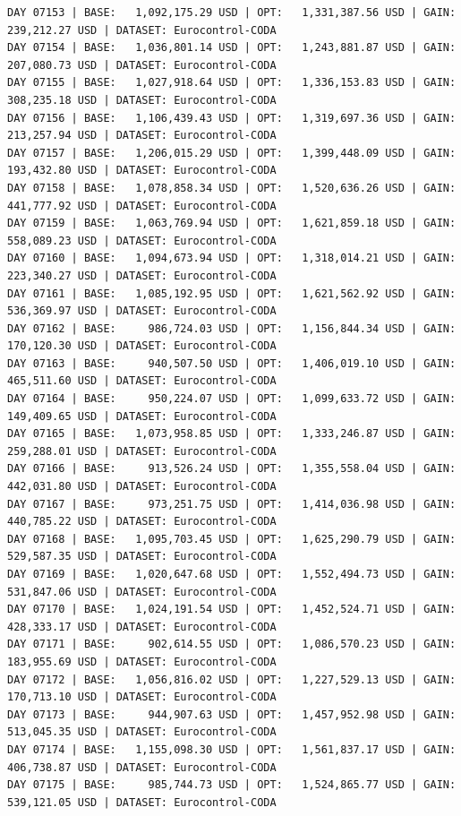 \documentclass[11pt,a4paper]{article}
\begin{document}
\begin{verbatim}
DAY 07153 | BASE:   1,092,175.29 USD | OPT:   1,331,387.56 USD | GAIN: 239,212.27 USD | DATASET: Eurocontrol-CODA
DAY 07154 | BASE:   1,036,801.14 USD | OPT:   1,243,881.87 USD | GAIN: 207,080.73 USD | DATASET: Eurocontrol-CODA
DAY 07155 | BASE:   1,027,918.64 USD | OPT:   1,336,153.83 USD | GAIN: 308,235.18 USD | DATASET: Eurocontrol-CODA
DAY 07156 | BASE:   1,106,439.43 USD | OPT:   1,319,697.36 USD | GAIN: 213,257.94 USD | DATASET: Eurocontrol-CODA
DAY 07157 | BASE:   1,206,015.29 USD | OPT:   1,399,448.09 USD | GAIN: 193,432.80 USD | DATASET: Eurocontrol-CODA
DAY 07158 | BASE:   1,078,858.34 USD | OPT:   1,520,636.26 USD | GAIN: 441,777.92 USD | DATASET: Eurocontrol-CODA
DAY 07159 | BASE:   1,063,769.94 USD | OPT:   1,621,859.18 USD | GAIN: 558,089.23 USD | DATASET: Eurocontrol-CODA
DAY 07160 | BASE:   1,094,673.94 USD | OPT:   1,318,014.21 USD | GAIN: 223,340.27 USD | DATASET: Eurocontrol-CODA
DAY 07161 | BASE:   1,085,192.95 USD | OPT:   1,621,562.92 USD | GAIN: 536,369.97 USD | DATASET: Eurocontrol-CODA
DAY 07162 | BASE:     986,724.03 USD | OPT:   1,156,844.34 USD | GAIN: 170,120.30 USD | DATASET: Eurocontrol-CODA
DAY 07163 | BASE:     940,507.50 USD | OPT:   1,406,019.10 USD | GAIN: 465,511.60 USD | DATASET: Eurocontrol-CODA
DAY 07164 | BASE:     950,224.07 USD | OPT:   1,099,633.72 USD | GAIN: 149,409.65 USD | DATASET: Eurocontrol-CODA
DAY 07165 | BASE:   1,073,958.85 USD | OPT:   1,333,246.87 USD | GAIN: 259,288.01 USD | DATASET: Eurocontrol-CODA
DAY 07166 | BASE:     913,526.24 USD | OPT:   1,355,558.04 USD | GAIN: 442,031.80 USD | DATASET: Eurocontrol-CODA
DAY 07167 | BASE:     973,251.75 USD | OPT:   1,414,036.98 USD | GAIN: 440,785.22 USD | DATASET: Eurocontrol-CODA
DAY 07168 | BASE:   1,095,703.45 USD | OPT:   1,625,290.79 USD | GAIN: 529,587.35 USD | DATASET: Eurocontrol-CODA
DAY 07169 | BASE:   1,020,647.68 USD | OPT:   1,552,494.73 USD | GAIN: 531,847.06 USD | DATASET: Eurocontrol-CODA
DAY 07170 | BASE:   1,024,191.54 USD | OPT:   1,452,524.71 USD | GAIN: 428,333.17 USD | DATASET: Eurocontrol-CODA
DAY 07171 | BASE:     902,614.55 USD | OPT:   1,086,570.23 USD | GAIN: 183,955.69 USD | DATASET: Eurocontrol-CODA
DAY 07172 | BASE:   1,056,816.02 USD | OPT:   1,227,529.13 USD | GAIN: 170,713.10 USD | DATASET: Eurocontrol-CODA
DAY 07173 | BASE:     944,907.63 USD | OPT:   1,457,952.98 USD | GAIN: 513,045.35 USD | DATASET: Eurocontrol-CODA
DAY 07174 | BASE:   1,155,098.30 USD | OPT:   1,561,837.17 USD | GAIN: 406,738.87 USD | DATASET: Eurocontrol-CODA
DAY 07175 | BASE:     985,744.73 USD | OPT:   1,524,865.77 USD | GAIN: 539,121.05 USD | DATASET: Eurocontrol-CODA

\end{verbatim}
\end{document}
